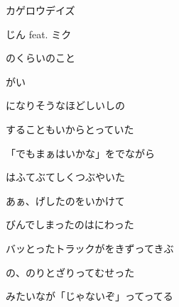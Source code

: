 \documentclass[a4paper,tate,twocolumn,12pt]{ltjtarticle}
\begin{document}
\thispagestyle{empty}

\begin{center}
{\LARGE カゲロウデイズ}

{\large じん feat. ミク}
\end{center}

\vspace{1em}

\begin{flushleft}

\noindent\begin{minipage}{\linewidth}
のくらいのこと

がい

になりそうなほどしいしの

することもいからとっていた
\end{minipage}

\vspace{2em}

\noindent\begin{minipage}{\linewidth}
「でもまぁはいかな」をでながら

はふてぶてしくつぶやいた
\end{minipage}

\vspace{2em}

\noindent\begin{minipage}{\linewidth}
あぁ、げしたのをいかけて

びんでしまったのはにわった
\end{minipage}

\vspace{2em}

\noindent\begin{minipage}{\linewidth}
バッとったトラックがをきずってきぶ

の、のりとざりってむせった

みたいなが「じゃないぞ」ってってる


\end{minipage}
\end{flushleft}
\end{document}
